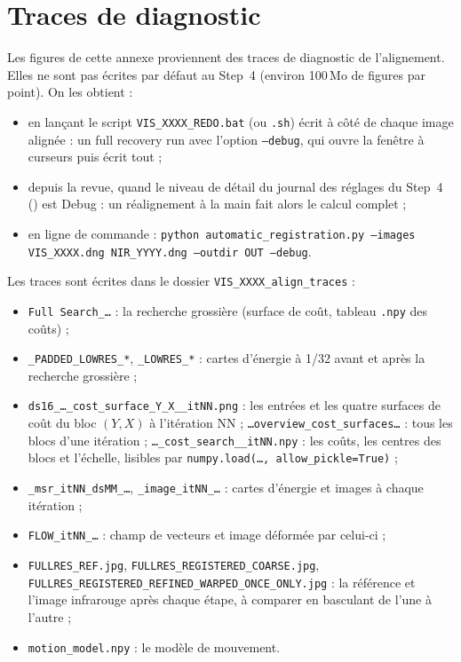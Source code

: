 \documentclass[a4paper,11pt]{report}
\DeclareRobustCommand{\bouton}[1]{\texorpdfstring{\fbox{\small\textsf{#1}}}{#1}}
\begin{document}
\section{Traces de diagnostic}\label{sec:ann_traces}
Les figures de cette annexe proviennent des traces de diagnostic de l'alignement. Elles ne sont pas écrites par défaut au Step~4 (environ 100\,Mo de figures par point). On les obtient :
\begin{itemize}
	\item en lançant le script \texttt{VIS\_XXXX\_REDO.bat} (ou \texttt{.sh}) écrit à côté de chaque image alignée : un \og full recovery run \fg{} avec l'option \texttt{--debug}, qui ouvre la fenêtre à curseurs puis écrit tout ;
	\item depuis la revue, quand le niveau de détail du journal des réglages du Step~4 (\bouton{⚙}) est \og Debug \fg{} : un réalignement à la main fait alors le calcul complet ;
	\item en ligne de commande : \texttt{python automatic\_registration.py --images VIS\_XXXX.dng NIR\_YYYY.dng --outdir OUT --debug}.
\end{itemize}
Les traces sont écrites dans le dossier \texttt{VIS\_XXXX\_align\_traces} :
\begin{itemize}
	\item \texttt{Full Search\_\ldots} : la recherche grossière (surface de coût, tableau \texttt{.npy} des coûts) ;
	\item \texttt{\_PADDED\_LOWRES\_*}, \texttt{\_LOWRES\_*} : cartes d'énergie à 1/32 avant et après la recherche grossière ;
	\item \texttt{ds16\_\ldots\_cost\_surface\_Y\_X\_\_itNN.png} : les entrées et les quatre surfaces de coût du bloc $(Y, X)$ à l'itération NN ; \texttt{\ldots overview\_cost\_surfaces\ldots} : tous les blocs d'une itération ; \texttt{\ldots\_cost\_search\_\_itNN.npy} : les coûts, les centres des blocs et l'échelle, lisibles par \texttt{numpy.load(\ldots, allow\_pickle=True)} ;
	\item \texttt{\_msr\_itNN\_dsMM\_\ldots}, \texttt{\_image\_itNN\_\ldots} : cartes d'énergie et images à chaque itération ;
	\item \texttt{FLOW\_itNN\_\ldots} : champ de vecteurs et image déformée par celui-ci ;
	\item \texttt{FULLRES\_REF.jpg}, \texttt{FULLRES\_REGISTERED\_COARSE.jpg}, \texttt{FULLRES\_REGISTERED\_REFINED\_WARPED\_ONCE\_ONLY.jpg} : la référence et l'image infrarouge après chaque étape, à comparer en basculant de l'une à l'autre ;
	\item \texttt{motion\_model.npy} : le modèle de mouvement.
\end{itemize}
\end{document}
